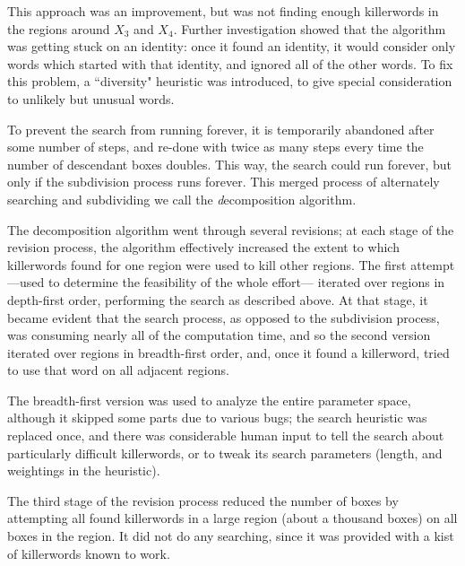 This approach was an improvement, but was not finding enough killerwords in the regions
around $X_3$ and $X_4$.  Further investigation showed that the
algorithm was getting stuck on an identity: once it found an identity,
it would consider only words which started with that identity, and
ignored all of the other words.  To fix this problem, a ``diversity"
heuristic was introduced, to give special consideration to unlikely but
unusual words.

To prevent the search from running forever, it is
temporarily abandoned after some number of steps, and re-done
with twice as many steps every time the number of descendant boxes
doubles.  This way, the search could run forever, but only if
the subdivision process runs forever.
This merged process of alternately searching and subdividing we
call the {\textit decomposition algorithm}.

The decomposition algorithm went through several revisions; at each stage
of the revision process,
the algorithm effectively increased the extent to which killerwords
found for one region were used to kill other regions.  The first
attempt---used to determine the feasibility of the whole effort---
iterated over regions in depth-first order, performing the search as
described above.
At that stage, it became evident that the search process, as
opposed to the subdivision process,
was consuming nearly all of the computation time, and so the second
version iterated over regions in breadth-first order, and, once it
found a killerword, tried to use that word on all adjacent regions.

The breadth-first version was used to analyze the entire parameter
space, although it skipped some parts due to various bugs; the search
heuristic was replaced once, and there was considerable human input
to tell the search about particularly difficult killerwords, or to tweak
its search parameters (length, and weightings in the heuristic).

The third stage of the revision process reduced the number of boxes
by attempting all found killerwords in a large region (about a thousand boxes)
on all boxes in the region.
It did not  do any searching,
since it was provided with a kist of killerwords known to work.

